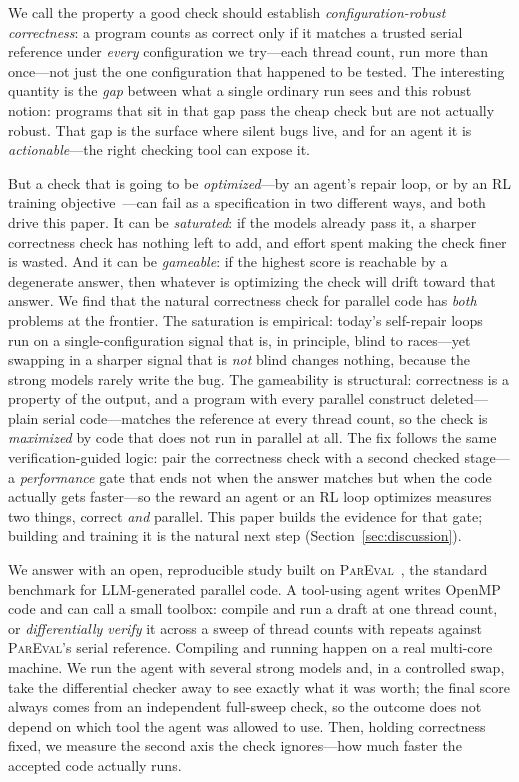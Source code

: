 We call the property a good check should establish \emph{configuration-robust
correctness}: a program counts as correct only if it matches a trusted serial reference
under \emph{every} configuration we try---each thread count, run more than once---not just
the one configuration that happened to be tested. The interesting quantity is the
\emph{gap} between what a single ordinary run sees and this robust notion: programs that
sit in that gap pass the cheap check but are not actually robust. That gap is the surface
where silent bugs live, and for an agent it is \emph{actionable}---the right checking tool
can expose it.

But a check that is going to be \emph{optimized}---by an agent's repair loop, or by an RL
training objective~\cite{rlvr,grpo}---can fail as a specification in two different ways,
and both drive this paper. It can be \emph{saturated}: if the models already pass it, a
sharper correctness check has nothing left to add, and effort spent making the check finer
is wasted. And it can be \emph{gameable}: if the highest score is reachable by a degenerate
answer, then whatever is optimizing the check will drift toward that answer. We find that
the natural correctness check for parallel code has \emph{both} problems at the frontier.
The saturation is empirical: today's self-repair loops~\cite{selfdebug,reflexion,lassi}
run on a single-configuration signal that is, in principle, blind to races---yet swapping
in a sharper signal that is \emph{not} blind changes nothing, because the strong models
rarely write the bug. The gameability is structural: correctness is a property of the
output, and a program with every parallel construct deleted---plain serial code---matches
the reference at every thread count, so the check is \emph{maximized} by code that does not
run in parallel at all. The fix follows the same verification-guided logic: pair the
correctness check with a second checked stage---a \emph{performance} gate that ends not
when the answer matches but when the code actually gets faster---so the reward an agent or
an RL loop optimizes measures two things, correct \emph{and} parallel. This paper builds
the evidence for that gate; building and training it is the natural next step
(Section~\ref{sec:discussion}).

We answer with an open, reproducible study built on \textsc{ParEval}~\cite{pareval}, the
standard benchmark for LLM-generated parallel code. A tool-using agent writes OpenMP code
and can call a small toolbox: compile and run a draft at one thread count, or
\emph{differentially verify} it across a sweep of thread counts with repeats against
\textsc{ParEval}'s serial reference. Compiling and running happen on a real multi-core
machine. We run the agent with several strong models and, in a controlled swap, take the
differential checker away to see exactly what it was worth; the final score always comes
from an independent full-sweep check, so the outcome does not depend on which tool the
agent was allowed to use. Then, holding correctness fixed, we measure the second axis the
check ignores---how much faster the accepted code actually runs.

